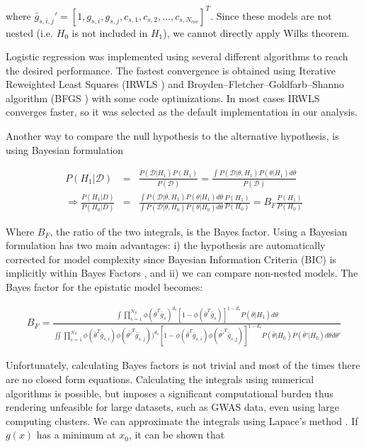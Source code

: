 where $\bar{g}_{s,i,j}' =  [1, g_{s,i}, g_{s,j}, c_{s,1} , c_{s,2}, ..., c_{s,N_{cov}} ]^T$. Since these models are not nested (i.e. $H_0$ is not included in $H_1$), we cannot directly apply Wilks theorem.

Logistic regression was implemented using several different algorithms to reach the desired performance. The fastest convergence is obtained using Iterative Reweighted Least Squares (IRWLS \cite{REF}) and Broyden–Fletcher–Goldfarb–Shanno algorithm (BFGS \cite{REF}) with some code optimizations. In most cases IRWLS converges faster, so it was selected as the default implementation in our analysis.

Another way to compare the null hypothesis to the alternative hypothesis, is using Bayesian formulation \cite{kass1995bayes,wakefield2009bayes}

\begin{eqnarray*}
P(H_1 | \mathcal{D}) & = & \frac{ P( \mathcal{D} | H_1) P(H_1) }{ P(\mathcal{D}) } = \frac{ \int{ P(\mathcal{D} | \theta , H_1) P( \theta | H_1)  d\theta } }{ P(\mathcal{D}) }  \\
\Rightarrow  \frac{ P(H_1 | D)  }{ P(H_0 | D)  } & = & \frac{ \int{ P(\mathcal{D} | \theta , H_1) P( \theta | H_1)  d\theta } }{\int{ P(\mathcal{D} | \theta , H_0 ) P( \theta | H_0)  d\theta } } \frac{ P(H_1) }{ P(H_0)  }  
=  B_F \frac{ P(H_1) }{ P(H_0)  }
\end{eqnarray*}

Where $B_F$, the ratio of the two integrals, is the Bayes factor. Using a Bayesian formulation has two main advantages: i) the hypothesis are automatically corrected for model complexity since Bayesian Information Criteria (BIC) is implicitly within Bayes Factors \cite{REF}, and ii) we can compare non-nested models. The Bayes factor for the epistatic model becomes:

\begin{eqnarray}\label{eq:bf2}
B_F = \frac
{ \int{ \prod_{s=1}^{N_S}{ \phi( \bar{\theta}^T \bar{g}_s)^{d_s} [ 1-\phi( \bar{\theta}^T \bar{g}_s) ]^{1-d_s} } P( \bar{\theta} | H_1)  d\theta } }
{ \iint{ \prod_{s=1}^{N_S}{ 
\phi( \bar{\theta}^T \bar{g}_{s,i}) 
\phi( \bar{\theta'}^T \bar{g}_{s,j} ) )^{d_s} 
[ 1-\phi( \bar{\theta}^T \bar{g}_{s,i}) \phi( \bar{\theta'}^T \bar{g}_{s,j} ) ]^{1-d_s} } 
P( \bar{\theta} | H_0) 
P( \bar{\theta}' | H_0)  
d\theta d\theta' } }
\end{eqnarray}

Unfortunately, calculating Bayes factors is not trivial and most of the times there are no closed form equations. Calculating the integrals using numerical algorithms is possible, but  imposes a significant computational burden thus rendering unfeasible for large datasets, such as GWAS data, even using large computing clusters. We can approximate the integrals using Lapace's method  \cite{kass1995bayes}. If $g(x)$ has a minimum at $x_0$, it can be shown that

